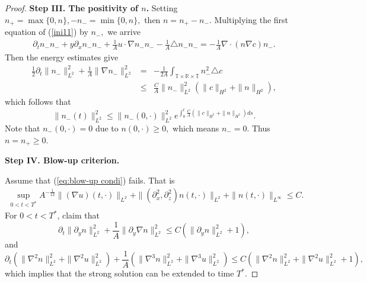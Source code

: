 \documentclass[12pt, reqno]{amsart}
\newtheorem{proposition}{Proposition}[section]
\newcommand{\ben}{\begin{eqnarray}}
\newcommand{\een}{\end{eqnarray}}
\newcommand{\beno}{\begin{eqnarray*}}
\newcommand{\eeno}{\end{eqnarray*}}
\numberwithin{equation}{section}
\begin{document}
\begin{proof}
   {\bf{ Step III. The positivity of $ n $.}}
	    Setting $ n_{+}=\max\{0, n\}, -n_{-}=\min\{0, n\}, $ then $ n=n_{+}-n_{-}. $ Multiplying the first equation of (\ref{ini11}) by $ n_{-}, $ we arrive
	  \begin{equation*}
	  	\begin{aligned}
	  	\partial_{t}n_{-}n_{-}+y\partial_{x}n_{-}n_{-}+\frac{1}{A}u\cdot\nabla n_{-}n_{-}-\frac{1}{A}\triangle n_{-}n_{-}=-\frac{1}{A}\nabla\cdot(n\nabla c)n_{-}.
	  	\end{aligned}
	  \end{equation*}
	  Then the energy estimates give
	  \beno
	  	\frac12\partial_{t}\|n_{-}\|_{L^{2}}^{2}+\frac{1}{A}\|\nabla n_{-}\|_{L^{2}}^{2}&=&-\frac{1}{2A}\int_{\mathbb{T}\times\mathbb{R}\times\mathbb{T}}n_{-}^2\triangle c\\
&\leq & \frac{C}{A}\|n_{-}\|_{L^{2}}^{2}(\|c\|_{H^2}+ \|n\|_{H^2} ),
	  \eeno
	  which follows that
	  \begin{equation*}
	  	\|n_{-}(t)\|_{L^{2}}^{2}\leq \|n_{-}(0,\cdot)\|_{L^{2}}^{2}e^{\int_0^t\frac{C}{A}(\|c\|_{H^2}+ \|n\|_{H^2} )ds}.
	  \end{equation*}
	  Note that $ n_{-}(0,\cdot)=0 $ due to $ n(0,\cdot)\geq 0, $ which means $ n_{-}=0. $ Thus $ n=n_{+}\geq 0. $

 {\bf Step IV. Blow-up criterion.}

Assume that (\ref{eq:blow-up condi}) fails. That is 
\ben\label{eq:blow-up condi'}
\sup_{0<t< T^*}A^{-\frac{1}{12}}\|(\nabla u)(t,\cdot)\|_{L^{2}}+
	\|(\partial_{x}^{2},\partial_{z}^{2})n(t,\cdot)\|_{L^{2}}+\|n(t,\cdot)\|_{L^{\infty}}\leq C.
\een
For $0<t<T^*$, claim that
	\begin{equation}\label{partial y n}
	\partial_{t}\|\partial_{y}n\|_{L^{2}}^{2}+\frac{1}{A}\|\partial_{y}\nabla n\|_{L^{2}}^{2}\leq C\left(\|\partial_{y}n\|_{L^{2}}^{2}+1 \right), 
	\end{equation}
	and
	\begin{equation}\label{n'' u''}
		\partial_{t}\left(\|\nabla^{2}n\|_{L^{2}}^{2}+\|\nabla^{2}u\|_{L^{2}}^{2} \right)+\frac{1}{A}\left(\|\nabla^{3}n\|_{L^{2}}^{2}+\|\nabla^{3}u\|_{L^{2}}^{2} \right)\leq C\left(\|\nabla^{2}n\|_{L^{2}}^{2}+\|\nabla^{2}u\|_{L^{2}}^{2}+1 \right),
	\end{equation}
which implies that the strong solution  can be extended to time $T^*$.


\end{proof}
\end{document}
